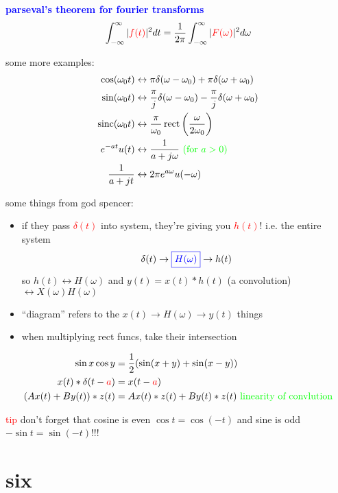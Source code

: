 \documentclass[a5paper, fleqn]{article}
\newcommand{\vocab}[1]{\textbf{\textcolor{blue}{#1}}}
\newcommand{\emf}[1]{\textcolor{red}{#1}}
\newcommand{\note}[1]{\textcolor{green}{#1}}
\newcommand{\eq}[1]{\textcolor{red}{$#1$}}
\DeclareMathOperator{\sinc}{sinc}
\DeclareMathOperator{\rect}{rect}
\begin{document}
\vocab{parseval's theorem for fourier transforms}
\[\int_{-\infty}^\infty |\emf{f(t)}|^2 dt = \frac{1}{2\pi} \int_{-\infty}^\infty |\emf{F(\omega)}|^2 d\omega\]

some more examples:
\begin{align*}
  \cos(\omega_0 t)  & \leftrightarrow \pi \delta(\omega - \omega_0) + \pi \delta(\omega + \omega_0)                     \\
  \sin(\omega_0 t)  & \leftrightarrow \frac{\pi}{j} \delta(\omega - \omega_0) - \frac{\pi}{j} \delta(\omega + \omega_0) \\
  \sinc(\omega_0 t) & \leftrightarrow \frac{\pi}{\omega_0} \rect\left(\frac{\omega}{2\omega_0}\right)                   \\
  e^{-at} u(t)      & \leftrightarrow \frac{1}{a + j\omega} ~ \note{\text{(for $a > 0$)}}                               \\
  \frac{1}{a + jt}  & \leftrightarrow 2\pi e^{a\omega} u(-\omega)
\end{align*}

some things from god spencer:
\begin{itemize}
  \item if they pass \eq{\delta(t)} into system, they're giving you \eq{h(t)}! i.e. the entire system
        \[\delta(t) \to \textcolor{blue}{\boxed{H(\omega)}} \to h(t)\]
        so $h(t) \leftrightarrow H(\omega)$ and $y(t) = x(t) * h(t)$ (a convolution) $\leftrightarrow X(\omega)H(\omega)$
  \item ``diagram'' refers to the $x(t) \to \boxed{H(\omega)} \to y(t)$ things
  \item when multiplying rect funcs, take their intersection
\end{itemize}
\begin{align*}
  \sin x \cos y              & = \frac{1}{2}(\sin(x + y) + \sin(x - y))                              \\
  x(t) * \delta(t - \emf{a}) & = x(t - \emf{a})                                                      \\
  (Ax(t) + By(t)) * z(t)     & = Ax(t) * z(t) + By(t) * z(t) ~ \note{\text{linearity of convlution}}
\end{align*}

\emf{tip} don't forget that cosine is even $\cos t = \cos(-t)$ and sine is odd $-\sin t = \sin(-t)$!!!

\section*{\textcolor{primary}{six}}
\end{document}
